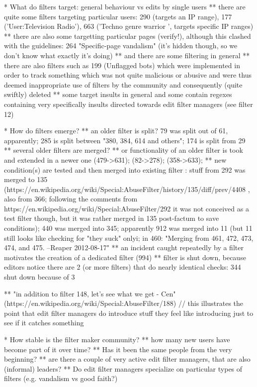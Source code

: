 * What do filters target: general behaviour vs edits by single users
  ** there are quite some filters targeting particular users: 290 (targets an IP range), 177 ('User:Television Radio'), 663 ('Techno genre warrior
', targets specific IP ranges)
  ** there are also some targetting particular pages (verify!), although this clashed with the guidelines: 264 "Specific-page vandalism" (it's hidden though, so we don't know what exactly it's doing)
  ** and there are some filtering in general
  ** there are also filters such as 199 (Unflagged bots) which were implemented in order to track something which was not quite malicious or abusive and were thus deemed inappropriate use of filters by the community and consequently (quite swiftly) deleted
  ** some target insults in general and some contain regexes containing very specifically insults directed towards edit filter managers (see filter 12)

* How do filters emerge?
  ** an older filter is split? 79 was split out of 61, apparently; 285 is split between "380, 384, 614 and others"; 174 is split from 29
  ** several older filters are merged?
  ** or functionality of an older filter is took and extended in a newer one (479->631); (82->278); (358->633);
  ** new condition(s) are tested and then merged into existing filter : stuff from 292 was merged to 135 (https://en.wikipedia.org/wiki/Special:AbuseFilter/history/135/diff/prev/4408 , also from 366; following the comments from https://en.wikipedia.org/wiki/Special:AbuseFilter/292 it was not conceived as a test filter though, but it was rather merged in 135 post-factum to save conditions); 440 was merged into 345; apparently 912 was merged into 11 (but 11 still looks like checking for "they suck" only^^); in 460: "Merging from 461, 472, 473, 474, and 475. --Reaper 2012-08-17"
  ** an incident caught repeatedly by a filter motivates the creation of a dedicated filter (994)
  ** filter is shut down, because editors notice there are 2 (or more filters) that do nearly identical checks: 344 shut down because of 3

  ** "in addition to filter 148, let's see what we get - Cen" (https://en.wikipedia.org/wiki/Special:AbuseFilter/188) // this illustrates the point that edit filter managers do introduce stuff they feel like introducing just to see if it catches something

* How stable is the filter maker community?
  ** how many new users have become part of it over time?
  ** Has it been the same people from the very beginning?
  ** are there a couple of very active edit filter managers, that are also (informal) leaders?
  ** Do edit filter managers specialize on particular types of filters (e.g. vandalism vs good faith?)

